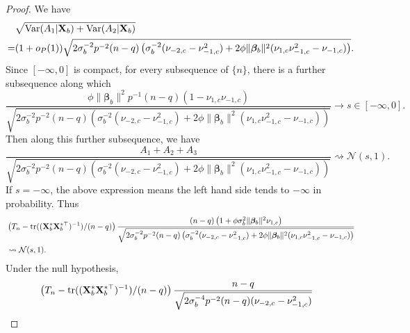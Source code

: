 \documentclass[11pt]{article}
\DeclareMathOperator{\mytr}{tr}
\DeclareMathOperator{\myVar}{Var}
\newcommand{\bfsym}[1]{\ensuremath{\boldsymbol{#1}}}
\def\bbeta{\bfsym \beta}
\theoremstyle{plain}
\theoremstyle{definition}
\theoremstyle{remark}
\begin{document}
\begin{proof}
We have 
\begin{equation*}
    \begin{split}
    &\sqrt{\myVar(A_1|\BX_b) + \myVar (A_2 |\BX_b)}
    \\
    =&(1+o_P(1))
    \sqrt{
    2\sigma_b^{-2} p^{-2} (n-q)
    \left( 
        \sigma_b^{-2} (\nu_{-2,c} - \nu_{-1,c}^2)
        +
        2\phi\|\bbeta_b\|^2 (\nu_{1,c} \nu_{-1,c}^2 -\nu_{-1,c})
    \right)
}
.
    \end{split}
\end{equation*}
Since $[-\infty,0]$ is compact, for every subsequence of $\{n\}$, there is a further subsequence along which 
\begin{equation*}
    \frac{
\phi \|\bbeta_b\|^2 p^{-1} (n-q) \left(1- \nu_{1,c}\nu_{-1,c}\right)
    }{
    \sqrt{
    2\sigma_b^{-2} p^{-2} (n-q)
    \left( 
        \sigma_b^{-2} (\nu_{-2,c} - \nu_{-1,c}^2)
        +
        2\phi \|\bbeta_b\|^2 (\nu_{1,c} \nu_{-1,c}^2 -\nu_{-1,c})
    \right)
}
    }
    \to s \in [-\infty, 0].
\end{equation*}
Then along this further subsequence, we have
\begin{equation*}
    \frac{A_1+A_2+A_3}{
        \sqrt{
    2\sigma_b^{-2} p^{-2} (n-q)
    \left( 
        \sigma_b^{-2} (\nu_{-2,c} - \nu_{-1,c}^2)
        +
        2\phi \|\bbeta_b\|^2 (\nu_{1,c} \nu_{-1,c}^2 -\nu_{-1,c})
    \right)
}
}
\rightsquigarrow \mathcal N(s,1).
\end{equation*}
If $s=-\infty$, the above expression means the left hand side tends to $-\infty$ in probability.
Thus
\begin{equation*}
    \begin{split}
        &
\left(
    T_n - \mytr((\BX_b^* \BX_b^{*\top})^{-1})/(n-q)
\right)
    \frac{
     (n-q)\left(
            1+ \phi \sigma_b^2 \|\bbeta_b\|^2  \nu_{1,c}
\right)
    }{
        \sqrt{
    2\sigma_b^{-2} p^{-2} (n-q)
    \left( 
        \sigma_b^{-2} (\nu_{-2,c} - \nu_{-1,c}^2)
        +
        2\phi \|\bbeta_b\|^2 (\nu_{1,c} \nu_{-1,c}^2 -\nu_{-1,c})
    \right)
}
    } 
\\
&
\rightsquigarrow \mathcal N(s,1).
    \end{split}
\end{equation*}
Under the null hypothesis,
\begin{equation*}
    \begin{split}
        &
\left(
    T_n - \mytr((\BX_b^* \BX_b^{*\top})^{-1})/(n-q)
\right)
    \frac{
     n-q
    }{
        \sqrt{
    2\sigma_b^{-4} p^{-2} (n-q)
         (\nu_{-2,c} - \nu_{-1,c}^2)
}}
\end{split}
\end{equation*}
\end{proof}
\end{document}
